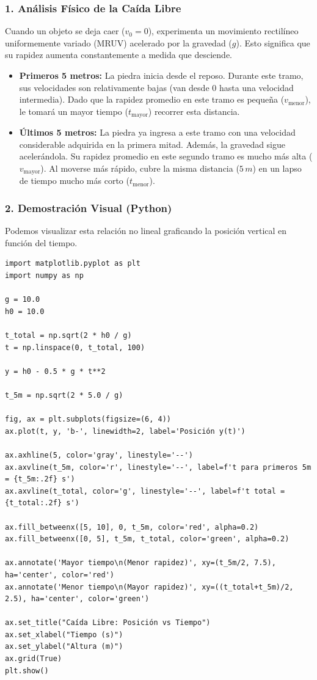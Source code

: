\documentclass[12pt, a4paper]{article}
\begin{document}
\subsubsection*{1. Análisis Físico de la Caída Libre}
Cuando un objeto se deja caer ($v_0 = 0$), experimenta un movimiento rectilíneo uniformemente variado (MRUV) acelerado por la gravedad ($g$). Esto significa que su rapidez aumenta constantemente a medida que desciende.

\begin{itemize}
    \item \textbf{Primeros 5 metros:} La piedra inicia desde el reposo. Durante este tramo, sus velocidades son relativamente bajas (van desde $0$ hasta una velocidad intermedia). Dado que la rapidez promedio en este tramo es pequeña ($v_{\text{menor}}$), le tomará un mayor tiempo ($t_{\text{mayor}}$) recorrer esta distancia.
    \item \textbf{Últimos 5 metros:} La piedra ya ingresa a este tramo con una velocidad considerable adquirida en la primera mitad. Además, la gravedad sigue acelerándola. Su rapidez promedio en este segundo tramo es mucho más alta ($v_{\text{mayor}}$). Al moverse más rápido, cubre la misma distancia ($5 \, \si{m}$) en un lapso de tiempo mucho más corto ($t_{\text{menor}}$).
\end{itemize}

\subsubsection*{2. Demostración Visual (Python)}
Podemos visualizar esta relación no lineal graficando la posición vertical en función del tiempo.

\begin{lstlisting}
import matplotlib.pyplot as plt
import numpy as np

g = 10.0
h0 = 10.0

t_total = np.sqrt(2 * h0 / g)
t = np.linspace(0, t_total, 100)

y = h0 - 0.5 * g * t**2

t_5m = np.sqrt(2 * 5.0 / g)

fig, ax = plt.subplots(figsize=(6, 4))
ax.plot(t, y, 'b-', linewidth=2, label='Posición y(t)')

ax.axhline(5, color='gray', linestyle='--')
ax.axvline(t_5m, color='r', linestyle='--', label=f't para primeros 5m = {t_5m:.2f} s')
ax.axvline(t_total, color='g', linestyle='--', label=f't total = {t_total:.2f} s')

ax.fill_betweenx([5, 10], 0, t_5m, color='red', alpha=0.2)
ax.fill_betweenx([0, 5], t_5m, t_total, color='green', alpha=0.2)

ax.annotate('Mayor tiempo\n(Menor rapidez)', xy=(t_5m/2, 7.5), ha='center', color='red')
ax.annotate('Menor tiempo\n(Mayor rapidez)', xy=((t_total+t_5m)/2, 2.5), ha='center', color='green')

ax.set_title("Caída Libre: Posición vs Tiempo")
ax.set_xlabel("Tiempo (s)")
ax.set_ylabel("Altura (m)")
ax.grid(True)
plt.show()
\end{lstlisting}
\end{document}
